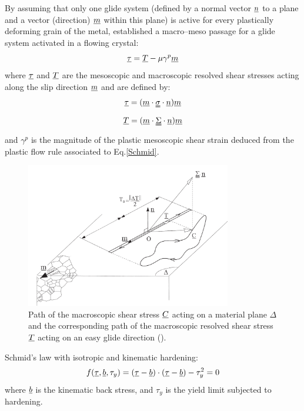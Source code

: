 By assuming that only one glide system (defined by a normal vector $\uline{n}$ to a plane and a vector
(direction) $\uline{m}$ within this plane) is active for every plastically deforming grain of the metal, \cite{papadopoulos1993fatigue}
established a macro–meso passage for a glide system activated in a flowing crystal:
\begin{equation}
\uline{\tau}=\uline{T}-\mu\gamma^p\uline{m}
\label{macromeso}
\end{equation}
where $\uline{\tau}$ and $\uline{T}$ are the mesoscopic and macroscopic
resolved shear stresses acting along the slip direction $\uline{m}$ and are defined by:
\begin{equation}
\uline{\tau}=(\uline{m}\cdot\uuline{\sigma}\cdot\uline{n})\uline{m}
\label{tau}
\end{equation}
\begin{equation}
\uline{T}=(\uline{m}\cdot\uuline{\Sigma}\cdot\uline{n})\uline{m}
\label{T}
\end{equation}
and $\gamma^p$  is  the magnitude of the plastic mesoscopic shear strain deduced from the plastic flow rule associated to Eq.\eqref{Schmid}.
\begin{figure}[h!]
	\centering
	\includegraphics[width=0.8\textwidth]{figures//glid.png} 
	\caption{Path of the macroscopic shear stress $\uline{C}$ acting on a material plane $\Delta$ and the corresponding path of the macroscopic resolved shear stress $\uline{T}$ acting on an easy glide direction (\cite{Morel2000101}).}
	\label{glid}
\end{figure}


Schmid's law with isotropic and kinematic hardening:
\begin{equation}
f(\uline{\tau},\uline{b},\tau_y)=(\uline{\tau}-\uline{b})\cdot(\uline{\tau}-\uline{b})-\tau_y^2=0
\label{Schmid}
\end{equation}
where $\uline{b}$ is the kinematic back stress, and $\tau_y$ is the yield limit subjected to hardening.


